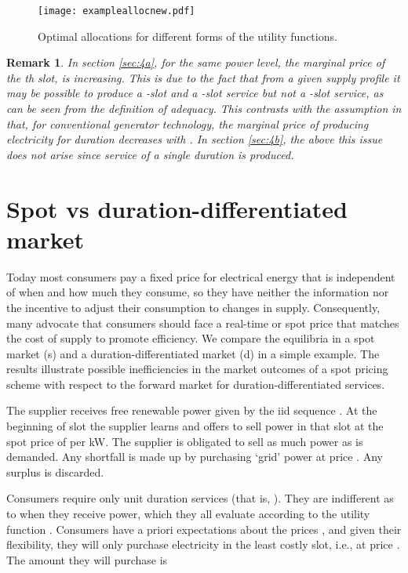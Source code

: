 \documentclass[10pt,draftcls,onecolumn]{IEEEtran}
\newtheorem{remark}{Remark}
\newcounter{l1}
\newcounter{l2}
\newcounter{l3}
\begin{document}
\begin{figure*}[!t]
\centering
\texttt{[image: exampleallocnew.pdf]}
\caption{Optimal allocations for different forms of the utility functions.}
\label{fig-ex}
\end{figure*}
\begin{remark}{ In section \ref{sec:4a}, for the same power level, the marginal price of the th slot,  is \textit{increasing}.  This is due to the fact that from a given 
supply profile it may be possible to produce  a -slot and a -slot service but not a -slot service, as can be seen from the definition of adequacy.  This contrasts with the assumption in  \cite{Chao-Oren86} that, for conventional generator technology, the marginal price of producing electricity for duration  decreases with . In section \ref{sec:4b}, the  above this issue does not arise since service of a single duration is produced.}
\end{remark}







\section{Spot vs duration-differentiated market} \label{sec-compare}
Today most consumers pay a fixed price for electrical energy that is independent of when and how much they consume, so they
have neither the information nor the incentive to adjust their consumption to changes in supply.  Consequently, many advocate that consumers should face a real-time or spot price that matches the cost of supply to promote efficiency.  We compare the equilibria in a spot market (s) and a duration-differentiated market (d) in a simple example. The results illustrate possible inefficiencies in the market outcomes of a spot pricing scheme with respect to the forward market for  duration-differentiated services.



The supplier receives free renewable power given by the iid sequence .  At the beginning of slot  the supplier learns  and offers to sell power in that slot at the spot price of  per kW.  The supplier is obligated to sell as much power as is demanded. Any shortfall is made up by purchasing `grid' power at price .  Any surplus is discarded.

Consumers require only unit duration services (that is, ).  They are indifferent as to when they receive power, which they all evaluate according to the  utility
function .  Consumers have a priori expectations  about the prices , and given their flexibility, they will only purchase
electricity in the least costly slot, i.e., at price .  The amount they will purchase is
 
\end{document}
